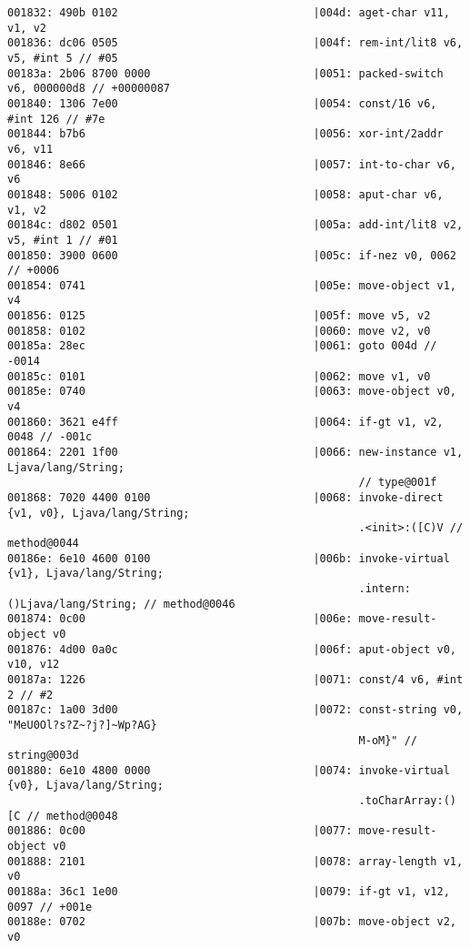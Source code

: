\begin{lstlisting}
001832: 490b 0102                              |004d: aget-char v11, v1, v2
001836: dc06 0505                              |004f: rem-int/lit8 v6, v5, #int 5 // #05
00183a: 2b06 8700 0000                         |0051: packed-switch v6, 000000d8 // +00000087
001840: 1306 7e00                              |0054: const/16 v6, #int 126 // #7e
001844: b7b6                                   |0056: xor-int/2addr v6, v11
001846: 8e66                                   |0057: int-to-char v6, v6
001848: 5006 0102                              |0058: aput-char v6, v1, v2
00184c: d802 0501                              |005a: add-int/lit8 v2, v5, #int 1 // #01
001850: 3900 0600                              |005c: if-nez v0, 0062 // +0006
001854: 0741                                   |005e: move-object v1, v4
001856: 0125                                   |005f: move v5, v2
001858: 0102                                   |0060: move v2, v0
00185a: 28ec                                   |0061: goto 004d // -0014
00185c: 0101                                   |0062: move v1, v0
00185e: 0740                                   |0063: move-object v0, v4
001860: 3621 e4ff                              |0064: if-gt v1, v2, 0048 // -001c
001864: 2201 1f00                              |0066: new-instance v1, Ljava/lang/String;
                                                      // type@001f
001868: 7020 4400 0100                         |0068: invoke-direct {v1, v0}, Ljava/lang/String;
                                                      .<init>:([C)V // method@0044
00186e: 6e10 4600 0100                         |006b: invoke-virtual {v1}, Ljava/lang/String;
                                                      .intern:()Ljava/lang/String; // method@0046
001874: 0c00                                   |006e: move-result-object v0
001876: 4d00 0a0c                              |006f: aput-object v0, v10, v12
00187a: 1226                                   |0071: const/4 v6, #int 2 // #2
00187c: 1a00 3d00                              |0072: const-string v0, "MeU0Ol?s?Z~?j?]~Wp?AG}
                                                      M-oM}" // string@003d
001880: 6e10 4800 0000                         |0074: invoke-virtual {v0}, Ljava/lang/String;
                                                      .toCharArray:()[C // method@0048
001886: 0c00                                   |0077: move-result-object v0
001888: 2101                                   |0078: array-length v1, v0
00188a: 36c1 1e00                              |0079: if-gt v1, v12, 0097 // +001e
00188e: 0702                                   |007b: move-object v2, v0

\end{lstlisting}
